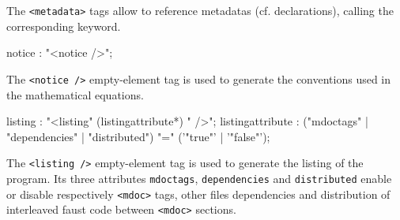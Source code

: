 The \lstinline'<metadata>' tags allow to reference \faust metadatas (cf. declarations), calling the corresponding keyword.


\begin{rail}
notice : "<notice />";
\end{rail}

The \lstinline'<notice />' empty-element tag is used to generate the conventions used in the mathematical equations.
% 

\begin{rail}
listing : "<listing" (listingattribute*) " />";
listingattribute : ("mdoctags" | "dependencies" | "distributed") "=" ('"true"' | '"false"');
\end{rail}


The \lstinline'<listing />' empty-element tag is used to generate the listing of the \faust program. Its three attributes \lstinline'mdoctags', \lstinline'dependencies' and \lstinline'distributed' enable or disable respectively \lstinline'<mdoc>' tags, other files dependencies and distribution of interleaved faust code between \lstinline'<mdoc>' sections.

